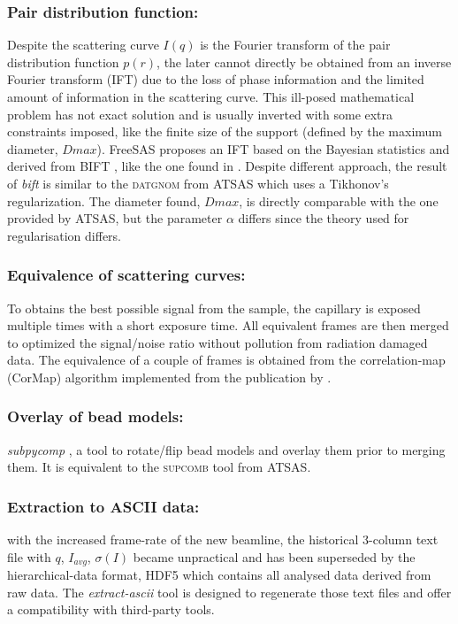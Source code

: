 \documentclass[preprint]{iucr}              %
\begin{document}
\subsubsection{Pair distribution function:}
Despite the scattering curve $I(q)$ is the Fourier transform of the pair distribution function $p(r)$, the later cannot directly be obtained from an inverse Fourier transform (IFT) due to the loss of phase information and the limited amount of information in the scattering curve. 
This ill-posed mathematical problem has not exact solution and is usually inverted with some extra constraints imposed, like the finite size of the support (defined by the maximum diameter, $Dmax$).    
FreeSAS proposes an IFT based on the Bayesian statistics and derived from BIFT \cite{bift}, like the one found in \cite{bioxtasraw}.
Despite different approach, the result of \textit{bift} is similar to the \textsc{datgnom} \cite{ATSAS1} from ATSAS which uses a Tikhonov's regularization.
The diameter found, $Dmax$, is directly comparable with the one provided by ATSAS, but the parameter $\alpha$ differs since the theory used for regularisation differs. 

\subsubsection{Equivalence of scattering curves: }
To obtains the best possible signal from the sample, the capillary is exposed multiple times with a short exposure time.
All equivalent frames are then merged to optimized the signal/noise ratio without pollution from radiation damaged data.  
The equivalence of a couple of frames is obtained from the correlation-map (CorMap) algorithm implemented from the publication by .

\subsubsection{Overlay of bead models:}
\textit{subpycomp} \cite{BM29ODA}, a tool to rotate/flip bead models and overlay them prior to merging them. It is equivalent to the \textsc{supcomb} \cite{supcomb} tool from ATSAS. 

\subsubsection{Extraction to ASCII data:} with the increased frame-rate of the new beamline, the historical 3-column text file with $q$, $I_{avg}$, $\sigma(I)$ became unpractical and has been superseded by the hierarchical-data format, HDF5 \cite{hdf5} which contains all analysed data derived from raw data.
The \textit{extract-ascii} tool is designed to regenerate those text files and offer a compatibility with third-party tools.
\end{document}
